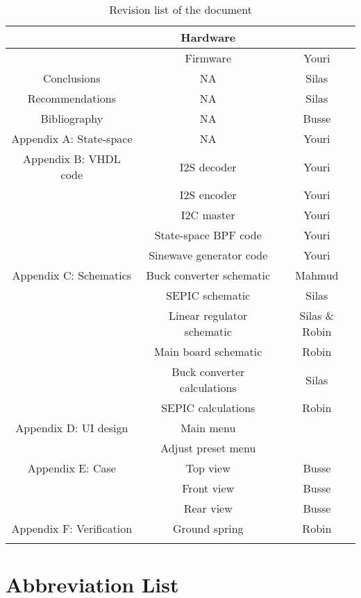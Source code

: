 \begin{justify}
\begin{longtable}{|c|c|c|}
								& Hardware						& 					\\ \hline
								& Firmware						& Youri				\\ \hline
	Conclusions					& NA							& Silas				\\ \hline
	Recommendations				& NA							& Silas				\\ \hline
	Bibliography				& NA							& Busse				\\ \hline
	Appendix A: State-space		& NA							& Youri				\\ \hline
	Appendix B: VHDL code		& I2S decoder					& Youri				\\ \hline
								& I2S encoder					& Youri				\\ \hline
								& I2C master					& Youri				\\ \hline
								& State-space BPF code			& Youri				\\ \hline
								& Sinewave generator code		& Youri				\\ \hline
	Appendix C: Schematics		& Buck converter schematic		& Mahmud			\\ \hline
								& SEPIC schematic				& Silas				\\ \hline
								& Linear regulator schematic	& Silas	\& Robin	\\ \hline
								& Main board schematic			& Robin				\\ \hline
								& Buck converter calculations	& Silas				\\ \hline
								& SEPIC calculations			& Robin				\\ \hline
	Appendix D: UI design		& Main menu						& 					\\ \hline
								& Adjust preset menu			& 					\\ \hline
	Appendix E: Case			& Top view						& Busse				\\ \hline
								& Front view					& Busse				\\ \hline
								& Rear view						& Busse				\\ \hline
	Appendix F: Verification	& Ground spring					& Robin				\\ \hline

	\caption{Revision list of the document}
	\label{table:revision_history}
\end{longtable}

\newpage
\pagestyle{plain}
\setcounter{page}{1}

\chapter*{Abbreviation List}


\end{justify}
